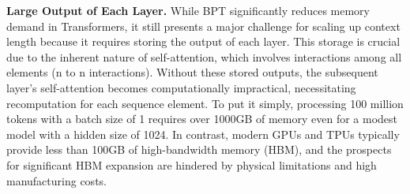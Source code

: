 \documentclass{article}
\begin{document}
\textbf{Large Output of Each Layer.}
While BPT significantly reduces memory demand in Transformers, it still presents a major challenge for scaling up context length because it requires storing the output of each layer. This storage is crucial due to the inherent nature of self-attention, which involves interactions among all elements (n to n interactions). Without these stored outputs, the subsequent layer's self-attention becomes computationally impractical, necessitating recomputation for each sequence element. To put it simply, processing 100 million tokens with a batch size of 1 requires over 1000GB of memory even for a modest model with a hidden size of 1024. In contrast, modern GPUs and TPUs typically provide less than 100GB of high-bandwidth memory (HBM), and the prospects for significant HBM expansion are hindered by physical limitations and high manufacturing costs.
\end{document}
